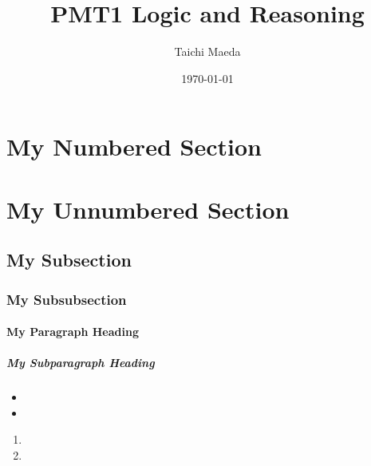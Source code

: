 \documentclass{main}
\title{PMT1 Logic and Reasoning}
\author{Taichi Maeda}
\date{\today}
\begin{document}
\maketitle

\tableofcontents

\begin{abstract}
    \lipsum[1][1-3]
\end{abstract}

\section{My Numbered Section}
\section*{My Unnumbered Section}
\subsection{My Subsection}
\subsubsection{My Subsubsection}
\paragraph{My Paragraph Heading} \lipsum[1][1-3]
\subparagraph{My Subparagraph Heading} \lipsum[1][1-3]

\textit{\lipsum[1][1]}

\textbf{\lipsum[1][1]}

\underline{\lipsum[1][1]}

\begin{itemize}
    \item \lipsum[1][1]
    \item \lipsum[1][1]
\end{itemize}

\begin{enumerate}
    \item \lipsum[1][1]
    \item \lipsum[1][1]
\end{enumerate}

\begin{quote}
    \lipsum[1][1-3]
\end{quote}

\begin{quotation}
    \lipsum[1][1-3]
    
    \lipsum[1][1-3]
\end{quotation}
\end{document}
